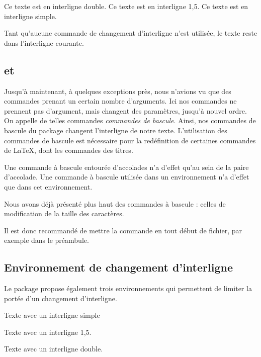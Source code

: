 \begin{latexcode}
\doublespacing
Ce texte est en interligne double.
\onehalfspacing
Ce texte est en interligne 1,5.
\singlespacing
Ce texte est en interligne simple. 
\end{latexcode}

Tant qu'aucune commande de changement d'interligne n'est utilisée, le texte reste dans l'interligne courante. 

\subsection{ et }\label{bascule}

Jusqu'à maintenant, à quelques exceptions près, nous n'avions vu que des commandes prenant un certain nombre d'arguments. Ici nos commandes ne prennent pas d'argument, mais changent des paramètres, jusqu'à nouvel ordre. On appelle de telles commandes \emph{commandes de bascule}. Ainsi, nos commandes de bascule du package  changent l'interligne de notre texte. L'utilisation des commandes de bascule est nécessaire pour la redéfinition de certaines commandes de \LaTeX, dont les commandes des titres.

Une commande à bascule entourée d'accolades n'a d'effet qu'au sein de la paire d'accolade. Une commande à bascule utilisée dans un environnement n'a d'effet que dans cet environnement.\label{porteebascule} 

Nous avons déjà présenté plus haut des commandes à bascule : celles de modification de la taille des caractères.

Il est donc recommandé de mettre la commande  en tout début de fichier, par exemple dans le préambule.

\subsection{Environnement de changement d'interligne}

Le package  propose également trois environnements qui permettent de limiter la portée d'un changement d'interligne. 

\begin{latexcode}
\begin{singlespace}
Texte avec un interligne simple
\end{singlespace}
\begin{onehalfspace}
Texte avec un interligne 1,5.
\end{onehalfspace}
\begin{doublespace}
Texte avec un interligne double.
\end{doublespace}
\end{latexcode}

